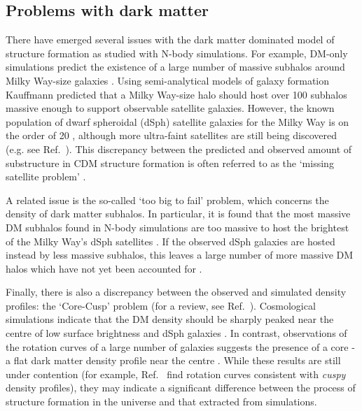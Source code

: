 
\subsection{Problems with dark matter}

There have emerged several issues with the dark matter dominated model of structure formation as studied with N-body simulations. For example, DM-only simulations predict the existence of a large number of massive subhalos around Milky Way-size galaxies \cite{Springel:2008}. Using semi-analytical models of galaxy formation Kauffmann \etal \cite{Kauffmann:1993} predicted that a Milky Way-size halo should host over 100 subhalos massive enough to support observable satellite galaxies.  However, the known population of dwarf spheroidal (dSph) satellite galaxies for the Milky Way is on the order of 20 \cite{Walker:2009}, although more ultra-faint satellites are still being discovered (e.g. see Ref.~\cite{Belokurov:2010}). This discrepancy between the predicted and observed amount of substructure in CDM structure formation is often referred to as the `missing satellite problem' \cite{Klypin:1999}.

A related issue is the so-called `too big to fail' problem, which concerns the density of dark matter subhalos. In particular, it is found that the most massive DM subhalos found in N-body simulations are too massive to host the brightest of the Milky Way's dSph satellites \cite{Boylan-Kolchin:2011}. If the observed dSph galaxies are hosted instead by less massive subhalos, this leaves a large number of more massive DM halos which have not yet been accounted for \cite{Garrison-Kimmel:2014}. 

Finally, there is also a discrepancy between the observed and simulated density profiles: the `Core-Cusp' problem (for a review, see Ref.~\cite{deBlok:2009}). Cosmological simulations indicate that the DM density should be sharply peaked near the centre of low surface brightness and dSph galaxies \cite{Dubinski:1991, Navarro:1996}. In contrast, observations of the rotation curves of a large number of galaxies suggests the presence of a core - a flat dark matter density profile near the centre \cite{Salucci:2001, Donato:2004}. While these results are still under contention (for example, Ref.~\cite{Hayashi:2004} find rotation curves consistent with \textit{cuspy} density profiles), they may indicate a significant difference between the process of structure formation in the universe and that extracted from \LCDM simulations.

